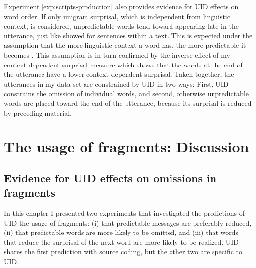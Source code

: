 Experiment \ref{exp:scripts-production} also provides evidence for UID effects on word order. If only unigram surprisal, which is independent from linguistic context, is considered, unpredictable words tend toward appearing late in the utterance, just like \citet{genzel.charniak2002} showed for sentences within a text. This is expected under the assumption that the more linguistic context a word has, the more predictable it becomes \citep{genzel.charniak2002, levy2008}. This assumption is in turn confirmed by the inverse effect of my context-dependent surprisal measure which shows that the words at the end of the utterance have a lower context-dependent surprisal. Taken together, the utterances in my data set are constrained by UID in two ways: First, UID constrains the omission of individual words, and second, otherwise unpredictable words are placed toward the end of the utterance, because its surprisal is reduced by preceding material.

\section{The usage of fragments: Discussion}
\label{sec:scripts-discussion}

\subsection{Evidence for UID effects on omissions in fragments}
In this chapter I presented two experiments that investigated the predictions of UID the usage of fragments: (i) that predictable messages are preferably reduced, (ii) that predictable words are more likely to be omitted, and (iii) that words that reduce the surprisal of the next word are more likely to be realized. UID shares the first prediction with source coding, but the other two are specific to UID.

